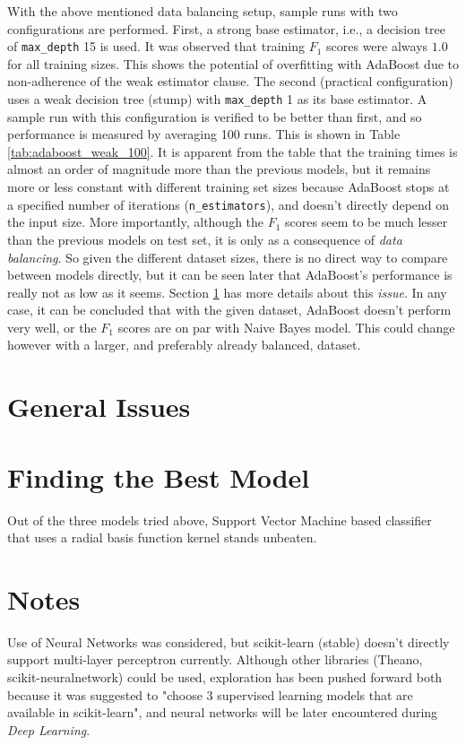 \documentclass{article}
\begin{document}
	With the above mentioned data balancing setup, sample runs with two configurations are performed. First, a strong base estimator, i.e., a decision tree of \texttt{max\_depth} 15 is used. It was observed that training $F_1$ scores were always $1.0$ for all training sizes. This shows the potential of overfitting with AdaBoost due to non-adherence of the weak estimator clause. The second (practical configuration) uses a weak decision tree (stump) with \texttt{max\_depth} 1 as its base estimator. A sample run with this configuration is verified to be better than first, and so performance is measured by averaging 100 runs. This is shown in Table \ref{tab:adaboost_weak_100}. It is apparent from the table that the training times is almost an order of magnitude more than the previous models, but it remains more or less constant with different training set sizes because AdaBoost stops at a specified number of iterations (\texttt{n\_estimators}), and doesn't directly depend on the input size. More importantly, although the $F_1$ scores seem to be much lesser than the previous models on test set, it is only as a consequence of \emph{data balancing}. So given the different dataset sizes, there is no direct way to compare between models directly, but it can be seen later that AdaBoost's performance is really not as low as it seems. Section \ref{general_issues} has more details about this \emph{issue}. In any case, it can be concluded that with the given dataset, AdaBoost doesn't perform very well, or the $F_1$ scores are on par with Naive Bayes model. This could change however with a larger, and preferably already balanced, dataset.
	
	\section{General Issues} \label{general_issues}
	
	\section{Finding the Best Model}
	Out of the three models tried above, Support Vector Machine based classifier that uses a radial basis function kernel stands unbeaten. 
	
	\section{Notes}
	Use of Neural Networks was considered, but scikit-learn (stable) doesn't directly support multi-layer perceptron currently. Although other libraries (Theano, scikit-neuralnetwork) could be used, exploration has been pushed forward both because it was suggested to "choose 3 supervised learning models that are available in scikit-learn", and neural networks will be later encountered during \emph{Deep Learning}.
	
	
	
\end{document}
